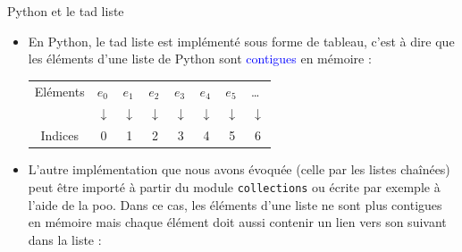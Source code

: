 \documentclass[10pt]{beamer}
\begin{document}
\begin{frame}
	\mframe{\SL}
	\begin{block}{Python et le {\sc tad} liste}
		\begin{itemize}
			\item<1->En Python, le {\sc tad} liste est implémenté sous forme de tableau, c'est à dire que les éléments d'une liste de Python sont \textcolor{blue}{contigues} en mémoire :
			      \begin{center}
				      \begin{tabular}{l|p{0.2cm}|p{0.2cm}|p{0.2cm}|p{0.2cm}|p{0.2cm}|p{0.2cm}|p{0.2cm}|}
					      \cline{2-8}
					      Eléments                    & $e_0$                            & $e_1$                            & $e_2$                            & $e_3$                            & $e_4$                            & $e_5$                            & \dots                            \\
					      \cline{2-8}
					      \multicolumn{1}{c}{ }       & \multicolumn{1}{c}{$\downarrow$} & \multicolumn{1}{c}{$\downarrow$} & \multicolumn{1}{c}{$\downarrow$} & \multicolumn{1}{c}{$\downarrow$} & \multicolumn{1}{c}{$\downarrow$} & \multicolumn{1}{c}{$\downarrow$} & \multicolumn{1}{c}{$\downarrow$} \\
					      \multicolumn{1}{c}{Indices} & \multicolumn{1}{c}{0}            & \multicolumn{1}{c}{1}            & \multicolumn{1}{c}{2}            & \multicolumn{1}{c}{3}            & \multicolumn{1}{c}{4}            & \multicolumn{1}{c}{5}            & \multicolumn{1}{c}{6}            \\
				      \end{tabular}
			      \end{center}
			\item<2-> L'autre implémentation que nous avons évoquée (celle par les listes chaînées) peut être importé à partir du module {\tt collections} ou écrite par exemple à l'aide de la {\sc poo}. Dans ce cas, les éléments d'une liste ne sont plus contigues en mémoire mais chaque élément doit aussi contenir un lien vers son suivant dans la liste :
			      \begin{center}
				        \quad {} \         
			      \end{center}
		\end{itemize}
	\end{block}
\end{frame}
\end{document}
